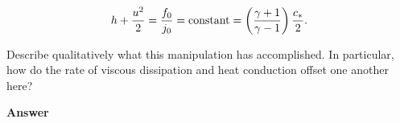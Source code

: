 \documentclass[12pt]{article}
\begin{document}
\begin{itemize}
\begin{equation*}
h + \frac{u^2}{2} = \frac{f_0}{j_0} = {\rm constant} = \left( \frac{\gamma + 1}{\gamma-1}\right)\frac{c_{*}}{2}.
\end{equation*}

Describe qualitatively what this manipulation has accomplished. In particular, how do the rate of viscous dissipation and heat conduction offset one another here?

\textbf{Answer}


 \end{itemize}
 

 
\end{document}
